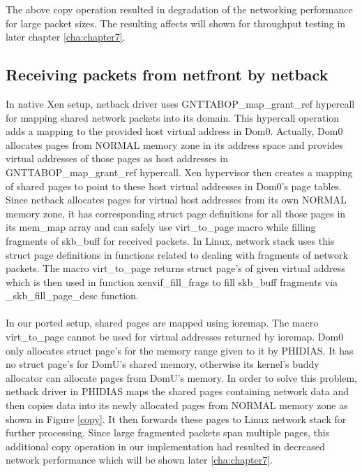 The above copy operation resulted in degradation of the networking performance for large packet sizes. The resulting affects will shown for throughput testing in later chapter \ref{cha:chapter7}.

\subsection{Receiving packets from netfront by netback \label{sec:rxnetfront}}
In native Xen setup, netback driver uses GNTTABOP\_map\_grant\_ref hypercall for mapping shared network packets into its domain. This hypercall operation adds a mapping to the provided host virtual address in Dom0. Actually, Dom0 allocates pages from NORMAL memory zone in its address space and provides virtual addresses of those pages as host addresses in  GNTTABOP\_map\_grant\_ref hypercall. Xen hypervisor then creates a mapping of shared pages to point to these host virtual addresses in Dom0's page tables. Since netback allocates pages for virtual host addresses from its own NORMAL memory zone, it has corresponding struct page definitions for all those pages in its mem\_map array \cite{mem_map} and can safely use virt\_to\_page macro while filling fragments of skb\_buff for received packets. In Linux, network stack uses this struct page definitions in functions related to dealing with fragments of network packets. The macro virt\_to\_page returns struct page's of given virtual address which is then used in function xenvif\_fill\_frags to fill skb\_buff fragments via \_skb\_fill\_page\_desc function.
\\
\\
In our ported setup, shared pages are mapped using ioremap. The macro virt\_to\_page cannot be used for virtual addresses returned by ioremap. Dom0 only allocates struct page's for the memory range given to it by PHIDIAS. It has no struct page's for DomU's shared memory, otherwise its kernel's buddy allocator  \cite{buddy} can allocate pages from DomU's memory. In order to solve this problem, netback driver in PHIDIAS maps the shared pages containing network data and then copies data into its newly allocated pages from NORMAL memory zone as shown in Figure \ref{copy}. It then forwards these pages to Linux network stack for further processing. Since large fragmented packets span multiple pages, this additional copy operation in our implementation had resulted in decreased network performance which will be shown later \ref{cha:chapter7}.
